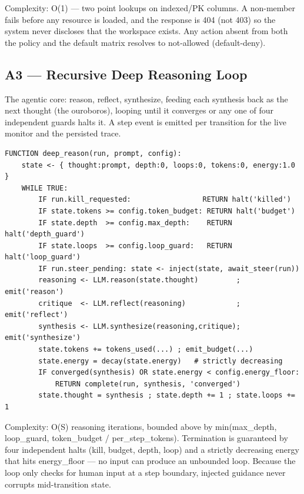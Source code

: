 \documentclass[12pt,a4paper]{report}
\begin{document}
Complexity: O(1) --- two point lookups on indexed/PK columns. A non-member fails before any resource is loaded, and the response is 404 (not 403) so the system never discloses that the workspace exists. Any action absent from both the policy and the default matrix resolves to not-allowed (default-deny).

\subsection{A3 --- Recursive Deep Reasoning Loop}
The agentic core: reason, reflect, synthesize, feeding each synthesis back as the next thought (the ouroboros), looping until it converges or any one of four independent guards halts it. A step event is emitted per transition for the live monitor and the persisted trace.

\begin{lstlisting}
FUNCTION deep_reason(run, prompt, config):
    state <- { thought:prompt, depth:0, loops:0, tokens:0, energy:1.0 }
    WHILE TRUE:
        IF run.kill_requested:                 RETURN halt('killed')
        IF state.tokens >= config.token_budget: RETURN halt('budget')
        IF state.depth  >= config.max_depth:    RETURN halt('depth_guard')
        IF state.loops  >= config.loop_guard:   RETURN halt('loop_guard')
        IF run.steer_pending: state <- inject(state, await_steer(run))
        reasoning <- LLM.reason(state.thought)         ; emit('reason')
        critique  <- LLM.reflect(reasoning)            ; emit('reflect')
        synthesis <- LLM.synthesize(reasoning,critique); emit('synthesize')
        state.tokens += tokens_used(...) ; emit_budget(...)
        state.energy = decay(state.energy)   # strictly decreasing
        IF converged(synthesis) OR state.energy < config.energy_floor:
            RETURN complete(run, synthesis, 'converged')
        state.thought = synthesis ; state.depth += 1 ; state.loops += 1
\end{lstlisting}

Complexity: O(S) reasoning iterations, bounded above by min(max\_depth, loop\_guard, token\_budget / per\_step\_tokens). Termination is guaranteed by four independent halts (kill, budget, depth, loop) and a strictly decreasing energy that hits energy\_floor --- no input can produce an unbounded loop. Because the loop only checks for human input at a step boundary, injected guidance never corrupts mid-transition state.
\end{document}
